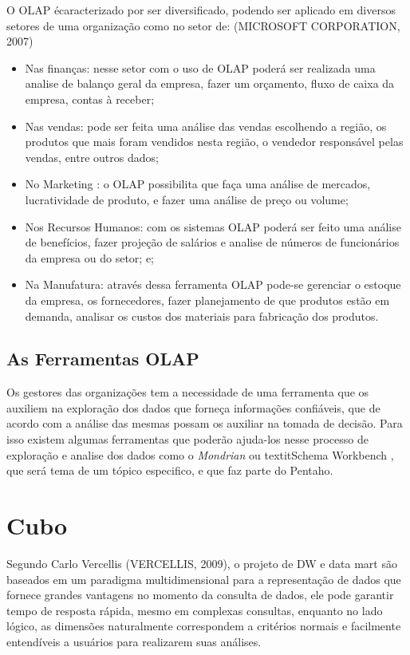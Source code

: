 O OLAP \'{e}caracterizado por ser diversificado, podendo ser aplicado em diversos setores de uma organização como no setor de: (MICROSOFT CORPORATION, 2007)

\begin{itemize}

    \item Nas finanças: nesse setor com o uso de OLAP poderá ser realizada uma analise de balanço geral da empresa, fazer um orçamento, fluxo de caixa da empresa, contas à receber;
    \item Nas vendas: pode ser feita uma análise das vendas escolhendo a região, os produtos que mais foram vendidos nesta região, o vendedor responsável pelas vendas, entre outros dados;
    \item No Marketing : o OLAP possibilita que faça uma análise de mercados, lucratividade de produto, e fazer uma análise de preço ou volume;
    \item Nos Recursos Humanos: com os sistemas OLAP poderá ser feito uma análise de benefícios, fazer projeção de salários e analise de números de funcionários da empresa ou do setor; e;
    \item Na Manufatura: através dessa ferramenta OLAP pode-se gerenciar o estoque da empresa, os fornecedores, fazer planejamento de que produtos estão em demanda, analisar os custos dos materiais para fabricação dos produtos.

\end{itemize}

\subsection{As Ferramentas OLAP}

Os gestores das organizações tem a necessidade de uma ferramenta que os auxiliem na exploração dos dados que forneça informações confiáveis, que de acordo com a análise das mesmas possam os auxiliar na tomada de decisão. Para isso existem algumas ferramentas que poderão ajuda-los nesse processo de exploração e analise dos dados como o \textit{Mondrian} ou textit{Schema Workbench} , que ser\'{a} tema de um tópico especifico, e que faz parte do Pentaho.

\section{Cubo}

Segundo Carlo Vercellis (VERCELLIS, 2009), o projeto de DW e data mart são baseados em um paradigma multidimensional para a representação de dados que fornece grandes vantagens no momento da consulta de dados, ele pode garantir tempo de resposta rápida, mesmo em complexas consultas, enquanto no lado lógico, as dimensões naturalmente correspondem a critérios normais e facilmente entendíveis a usuários para realizarem suas análises.


